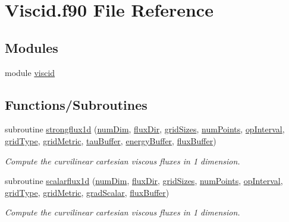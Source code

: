 \hypertarget{Viscid_8f90}{}\section{Viscid.\+f90 File Reference}
\label{Viscid_8f90}
\subsection*{Modules}
\begin{DoxyCompactItemize}
\item 
module \hyperlink{namespaceviscid}{viscid}
\end{DoxyCompactItemize}
\subsection*{Functions/\+Subroutines}
\begin{DoxyCompactItemize}
\item 
subroutine \hyperlink{namespaceviscid_aa370fc5ec33429588facc68ee01d8435}{strongflux1d} (\hyperlink{SATKernels_8H_a680185db8546de161968dabace9e94f1}{num\+Dim}, \hyperlink{ViscidKernels_8H_a466b72ae195460a9c9f2d36373803dc5}{flux\+Dir}, \hyperlink{ViscidKernels_8H_a969a5d6106eec8b7096250b27865b9ba}{grid\+Sizes}, \hyperlink{ViscidKernels_8H_adf0bf75d0875d1bb42a5348bee7b7bfd}{num\+Points}, \hyperlink{WENOKernels_8H_a23d86f4608a92738225f87574392b273}{op\+Interval}, \hyperlink{WENOKernels_8H_ab35a6cf312bb0fddda7097a149c3e946}{grid\+Type}, \hyperlink{WENOKernels_8H_a901f07fa4e3f966a2f6951d6c5974e89}{grid\+Metric}, \hyperlink{ViscidKernels_8H_a4fefa736ee83a524669dc93b83a218df}{tau\+Buffer}, \hyperlink{ViscidKernels_8H_a19a1cdfafabea8c3529fb1f5f0f12fcc}{energy\+Buffer}, \hyperlink{ViscidKernels_8H_abbdaff041c5151009f87fbae1b58e666}{flux\+Buffer})
\begin{DoxyCompactList}\small\item\em Compute the curvilinear cartesian viscous fluxes in 1 dimension. \end{DoxyCompactList}\item 
subroutine \hyperlink{namespaceviscid_aa6a01cbecb9c6bafc111dc0dd7411891}{scalarflux1d} (\hyperlink{SATKernels_8H_a680185db8546de161968dabace9e94f1}{num\+Dim}, \hyperlink{ViscidKernels_8H_a466b72ae195460a9c9f2d36373803dc5}{flux\+Dir}, \hyperlink{ViscidKernels_8H_a969a5d6106eec8b7096250b27865b9ba}{grid\+Sizes}, \hyperlink{ViscidKernels_8H_adf0bf75d0875d1bb42a5348bee7b7bfd}{num\+Points}, \hyperlink{WENOKernels_8H_a23d86f4608a92738225f87574392b273}{op\+Interval}, \hyperlink{WENOKernels_8H_ab35a6cf312bb0fddda7097a149c3e946}{grid\+Type}, \hyperlink{WENOKernels_8H_a901f07fa4e3f966a2f6951d6c5974e89}{grid\+Metric}, \hyperlink{ViscidKernels_8H_a239db5332b411ca172b2f9bf4b0d92bf}{grad\+Scalar}, \hyperlink{ViscidKernels_8H_abbdaff041c5151009f87fbae1b58e666}{flux\+Buffer})
\begin{DoxyCompactList}\small\item\em Compute the curvilinear cartesian viscous fluxes in 1 dimension. \end{DoxyCompactList}\end{DoxyCompactItemize}
